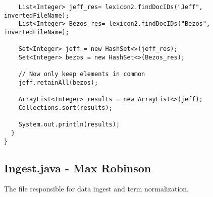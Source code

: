 \documentclass{article}
\begin{document}
\begin{verbatim}
    List<Integer> jeff_res= lexicon2.findDocIDs("Jeff", invertedFileName);
    List<Integer> Bezos_res= lexicon2.findDocIDs("Bezos", invertedFileName);

    Set<Integer> jeff = new HashSet<>(jeff_res);
    Set<Integer> bezos = new HashSet<>(Bezos_res);

    // Now only keep elements in common
    jeff.retainAll(bezos);

    ArrayList<Integer> results = new ArrayList<>(jeff);
    Collections.sort(results);

    System.out.println(results);
  }
}
\end{verbatim}

\subsection{Ingest.java - Max Robinson}
The file responsible for data ingest and term normalization. 
\end{document}

